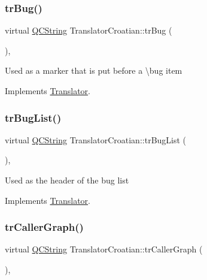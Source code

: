 \mbox{\label{class_translator_croatian_a75fb4c2b60df30469878834f02dae136}} 
\subsubsection{\texorpdfstring{trBug()}{trBug()}}
{\footnotesize\ttfamily virtual \mbox{\hyperlink{class_q_c_string}{Q\+C\+String}} Translator\+Croatian\+::tr\+Bug (\begin{DoxyParamCaption}{ }\end{DoxyParamCaption})\hspace{0.3cm}{\ttfamily [inline]}, {\ttfamily [virtual]}}

Used as a marker that is put before a \textbackslash{}bug item 

Implements \mbox{\hyperlink{class_translator}{Translator}}.

\mbox{\label{class_translator_croatian_a95d42281050b16f36d7e7b260c53f8e3}} 
\subsubsection{\texorpdfstring{trBugList()}{trBugList()}}
{\footnotesize\ttfamily virtual \mbox{\hyperlink{class_q_c_string}{Q\+C\+String}} Translator\+Croatian\+::tr\+Bug\+List (\begin{DoxyParamCaption}{ }\end{DoxyParamCaption})\hspace{0.3cm}{\ttfamily [inline]}, {\ttfamily [virtual]}}

Used as the header of the bug list 

Implements \mbox{\hyperlink{class_translator}{Translator}}.

\mbox{\label{class_translator_croatian_ad00aca202061f70b8c307335009491d9}} 
\subsubsection{\texorpdfstring{trCallerGraph()}{trCallerGraph()}}
{\footnotesize\ttfamily virtual \mbox{\hyperlink{class_q_c_string}{Q\+C\+String}} Translator\+Croatian\+::tr\+Caller\+Graph (\begin{DoxyParamCaption}{ }\end{DoxyParamCaption})\hspace{0.3cm}{\ttfamily [inline]}, {\ttfamily [virtual]}}

